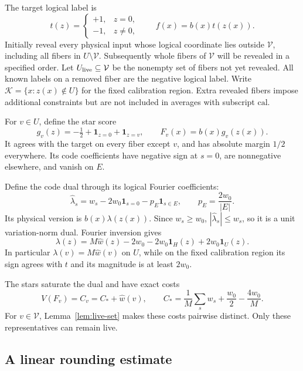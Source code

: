 \documentclass[11pt]{article}
\theoremstyle{remark}\newtheorem{remark}[theorem]{Remark}
\newcommand{\one}{\mathbf1}\newcommand{\F}{\mathbb F}
\begin{document}
The target logical label is
\[
 t(z)=\begin{cases}+1,&z=0,\\-1,&z\ne0,\end{cases}
 \qquad f(x)=b(x)t(z(x)).
\]
Initially reveal every physical input whose logical coordinate lies
outside $\mathcal V$, including all fibers in $U\setminus\mathcal V$.
Subsequently whole fibers of $\mathcal V$ will be revealed in a specified order. Let $U_{\rm live}\subseteq\mathcal V$ be the nonempty set of
fibers not yet revealed. All known labels on a removed fiber are the
negative logical label. Write $\mathcal K=\{x:z(x)\notin U\}$ for the fixed calibration region. Extra revealed fibers impose additional constraints but are not included in averages with subscript $\mathrm{cal}$.

For $v\in U$, define the star score
\[
 g_v(z)=-\tfrac12+\one_{z=0}+\one_{z=v},\qquad
 F_v(x)=b(x)g_v(z(x)).
\]
It agrees with the target on every fiber except $v$, and has absolute
margin $1/2$ everywhere. Its code coefficients have negative sign at
$s=0$, are nonnegative elsewhere, and vanish on $E$.

Define the code dual through its logical Fourier coefficients:
\begin{equation}\label{eq:dual}
 \widehat\lambda_s=w_s-2w_0\one_{s=0}-p_E\one_{s\in E},
 \qquad p_E=\frac{2w_0}{|E|}.
\end{equation}
Its physical version is $b(x)\lambda(z(x))$. Since $w_s\ge w_0$,
$|\widehat\lambda_s|\le w_s$, so it is a unit variation-norm dual.
Fourier inversion gives
\begin{equation}\label{eq:dual-values}
 \lambda(z)=M\widehat w(z)-2w_0-2w_0\one_H(z)+2w_0\one_U(z).
\end{equation}
In particular $\lambda(v)=M\widehat w(v)$ on $U$, while on the fixed calibration region
its sign agrees with $t$ and its magnitude is at least $2w_0$.

The stars saturate the dual and have exact costs
\begin{equation}\label{eq:star-costs}
 V(F_v)=C_v=C_*+\widehat w(v),\qquad
 C_*=\frac1M\sum_sw_s+\frac{w_0}{2}-\frac{4w_0}{M}.
\end{equation}
For $v\in\mathcal V$, Lemma~\ref{lem:live-set} makes these costs
pairwise distinct. Only these representatives can remain live.

\subsection{A linear rounding estimate}
\end{document}

